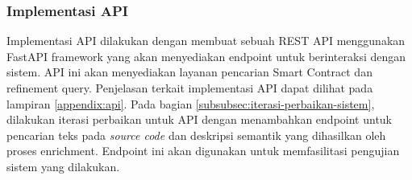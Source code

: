 \subsubsection{Implementasi API}

Implementasi API dilakukan dengan membuat sebuah REST API menggunakan FastAPI framework yang akan menyediakan endpoint untuk berinteraksi dengan sistem. API ini akan menyediakan layanan pencarian Smart Contract dan refinement query. Penjelasan terkait implementasi API dapat dilihat pada lampiran \ref{appendix:api}. Pada bagian \ref{subsubsec:iterasi-perbaikan-sistem}, dilakukan iterasi perbaikan untuk API dengan menambahkan endpoint untuk pencarian teks pada \textit{source code} dan deskripsi semantik yang dihasilkan oleh proses enrichment. Endpoint ini akan digunakan untuk memfasilitasi pengujian sistem yang dilakukan.

